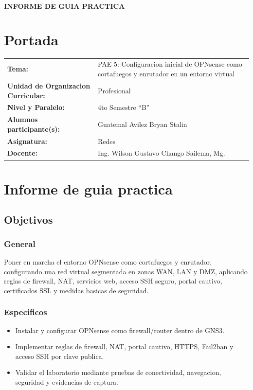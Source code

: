 \documentclass{article}
\renewcommand{\_}{\oldunderscore\hskip0pt\relax}
\begin{document}
\begin{center}
    {\large \textbf{INFORME DE GUIA PRACTICA}} \\
\end{center}

\section*{Portada}
\begin{flushleft}
\renewcommand{\arraystretch}{1.3}
\begin{tabular}{@{}p{4.2cm}p{\dimexpr\textwidth-4.2cm-2\tabcolsep\relax}@{}}
    \textbf{Tema:} & PAE 5: Configuracion inicial de OPNsense como cortafuegos y enrutador en un entorno virtual \\
    \textbf{Unidad de Organizacion Curricular:} & Profesional \\
    \textbf{Nivel y Paralelo:} & 4to Semestre ``B''\\
    \textbf{Alumnos participante(s):} & Guatemal Avilez Bryan Stalin\\
    \textbf{Asignatura:} & Redes \\
    \textbf{Docente:} & Ing. Wilson Gustavo Chango Sailema, Mg. \\
\end{tabular}
\renewcommand{\arraystretch}{1}
\end{flushleft}

\section*{Informe de guia practica}
\subsection*{Objetivos}
\subsubsection*{General}
Poner en marcha el entorno OPNsense como cortafuegos y enrutador, configurando una red virtual segmentada en zonas WAN, LAN y DMZ, aplicando reglas de firewall, NAT, servicios web, acceso SSH seguro, portal cautivo, certificados SSL y medidas basicas de seguridad.

\subsubsection*{Especificos}
\begin{itemize}
    \item Instalar y configurar OPNsense como firewall/router dentro de GNS3.
    \item Implementar reglas de firewall, NAT, portal cautivo, HTTPS, Fail2ban y acceso SSH por clave publica.
    \item Validar el laboratorio mediante pruebas de conectividad, navegacion, seguridad y evidencias de captura.
\end{itemize}
\end{document}
